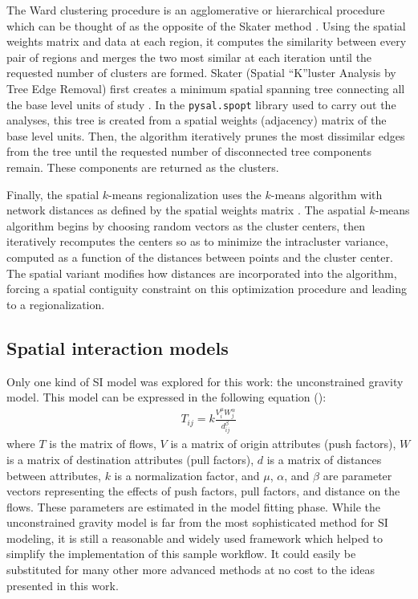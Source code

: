 \documentclass{article}
\begin{document}
    The Ward clustering procedure is an agglomerative or hierarchical procedure which can be thought of as the opposite of the Skater method \cite{Ward1963}. Using the spatial weights matrix and data at each region, it computes the similarity between every pair of regions and merges the two most similar at each iteration until the requested number of clusters are formed. Skater (Spatial ``K''luster Analysis by Tree Edge Removal) first creates a minimum spatial spanning tree connecting all the base level units of study \cite{Assuncao2006}. In the \texttt{pysal.spopt} library used to carry out the analyses, this tree is created from a spatial weights (adjacency) matrix of the base level units. Then, the algorithm iteratively prunes the most dissimilar edges from the tree until the requested number of disconnected tree components remain. These components are returned as the clusters.

    Finally, the spatial $k$-means regionalization uses the $k$-means algorithm with network distances as defined by the spatial weights matrix \cite{Lloyd1982}. The aspatial $k$-means algorithm begins by choosing random vectors as the cluster centers, then iteratively recomputes the centers so as to minimize the intracluster variance, computed as a function of the distances between points and the cluster center. The spatial variant modifies how distances are incorporated into the algorithm, forcing a spatial contiguity constraint on this optimization procedure and leading to a regionalization.

    \subsection{Spatial interaction models}
    Only one kind of SI model was explored for this work: the unconstrained gravity model. This model can be expressed in the following equation (\cite{Oshan2016}): \begin{align*}
        T_{ij} = k\frac{V_i^\mu W_j^\alpha}{d_{ij}^\beta}
    \end{align*} where $T$ is the matrix of flows, $V$ is a matrix of origin attributes (push factors), $W$ is a matrix of destination attributes (pull factors), $d$ is a matrix of distances between attributes, $k$ is a normalization factor, and $\mu$, $\alpha$, and $\beta$ are parameter vectors representing the effects of push factors, pull factors, and distance on the flows. These parameters are estimated in the model fitting phase. While the unconstrained gravity model is far from the most sophisticated method for SI modeling, it is still a reasonable and widely used framework which helped to simplify the implementation of this sample workflow. It could easily be substituted for many other more advanced methods at no cost to the ideas presented in this work.
\end{document}
